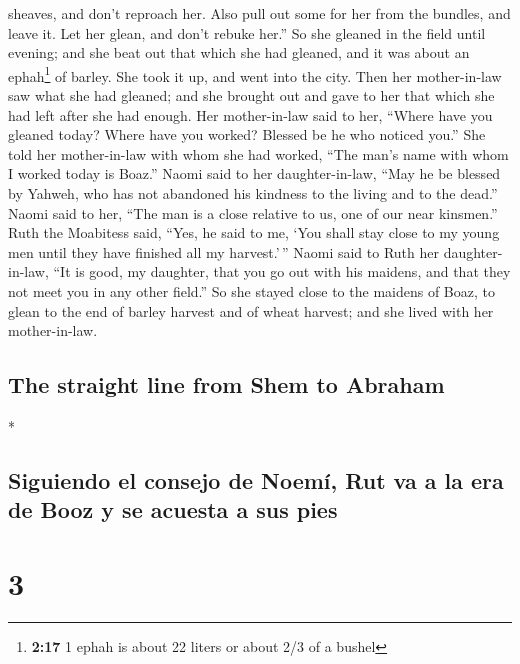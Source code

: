 \begin{paracol}{2}
\begin{otherlanguage}{english}
sheaves, and don't reproach her.  Also pull out some for
her from the bundles, and leave it. Let her glean, and don't rebuke
her.''  So she gleaned in the field until evening; and
she beat out that which she had gleaned, and it was about an
ephah\footnote{\textbf{2:17} 1 ephah is about 22 liters or about 2/3 of
  a bushel} of barley.  She took it up, and went into the
city. Then her mother-in-law saw what she had gleaned; and she brought
out and gave to her that which she had left after she had enough.
 Her mother-in-law said to her, ``Where have you gleaned
today? Where have you worked? Blessed be he who noticed you.'' She told
her mother-in-law with whom she had worked, ``The man's name with whom I
worked today is Boaz.''  Naomi said to her
daughter-in-law, ``May he be blessed by Yahweh, who has not abandoned
his kindness to the living and to the dead.'' Naomi said to her, ``The
man is a close relative to us, one of our near kinsmen.''
 Ruth the Moabitess said, ``Yes, he said to me, `You
shall stay close to my young men until they have finished all my
harvest.'\,''  Naomi said to Ruth her daughter-in-law,
``It is good, my daughter, that you go out with his maidens, and that
they not meet you in any other field.''  So she stayed
close to the maidens of Boaz, to glean to the end of barley harvest and
of wheat harvest; and she lived with her mother-in-law.

\hypertarget{the-straight-line-from-shem-to-abraham}{%
\subsection{The straight line from Shem to
Abraham}\label{the-straight-line-from-shem-to-abraham}}

\end{otherlanguage}

\switchcolumn[0]*

\hypertarget{siguiendo-el-consejo-de-noemuxed-rut-va-a-la-era-de-booz-y-se-acuesta-a-sus-pies}{%
\subsection{Siguiendo el consejo de Noemí, Rut va a la era de Booz y se
acuesta a sus
pies}\label{siguiendo-el-consejo-de-noemuxed-rut-va-a-la-era-de-booz-y-se-acuesta-a-sus-pies}}

\hypertarget{section-4}{%
\section{3}\label{section-4}}


\end{paracol}
